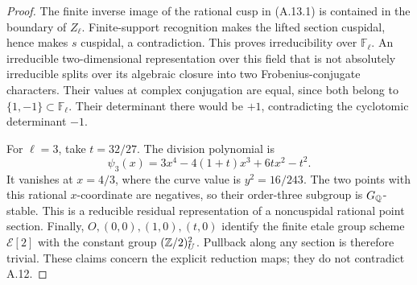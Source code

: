 \begin{proof}
The finite inverse image of the rational cusp in (A.13.1) is contained
in the boundary of $Z_\ell$.  Finite-support recognition makes the
lifted section cuspidal, hence makes $s$ cuspidal, a contradiction.
This proves irreducibility over $\mathbb F_\ell$.  An irreducible
two-dimensional representation over this field that is not absolutely
irreducible splits over its algebraic closure into two Frobenius-conjugate
characters.  Their values at complex conjugation are equal, since both
belong to $\{1,-1\}\subset\mathbb F_\ell$.  Their determinant there
would be $+1$, contradicting the cyclotomic determinant $-1$.

For $\ell=3$, take $t=32/27$.  The division polynomial is
\[
 \psi_3(x)=3x^4-4(1+t)x^3+6tx^2-t^2.
\]
It vanishes at $x=4/3$, where the curve value is $y^2=16/243$.
The two points with this rational $x$-coordinate are negatives, so their
order-three subgroup is $G_\mathbb Q$-stable.  This is a reducible residual
representation of a noncuspidal rational point section.  Finally,
$O,(0,0),(1,0),(t,0)$ identify the finite etale group scheme
$\mathcal E[2]$ with the constant group $(\mathbb Z/2)^2_U$.  Pullback along
any section is therefore trivial.  These claims concern the explicit
reduction maps; they do not contradict A.12.
\end{proof}

